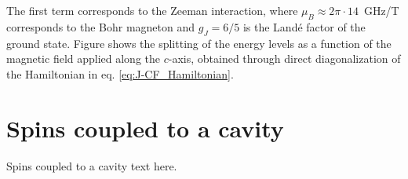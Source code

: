 The first term corresponds to the Zeeman interaction, where $\mu_B\approx2\pi\cdot14$~GHz/T corresponds to the Bohr magneton and $g_J=6/5$ is the Landé factor of the \Er ground state. Figure  shows the splitting of the energy levels as a function of the magnetic field applied along the $c$-axis, obtained through direct diagonalization of the Hamiltonian in eq. \ref{eq:J-CF_Hamiltonian}. 


\section{Spins coupled to a cavity}
Spins coupled to a cavity text here.